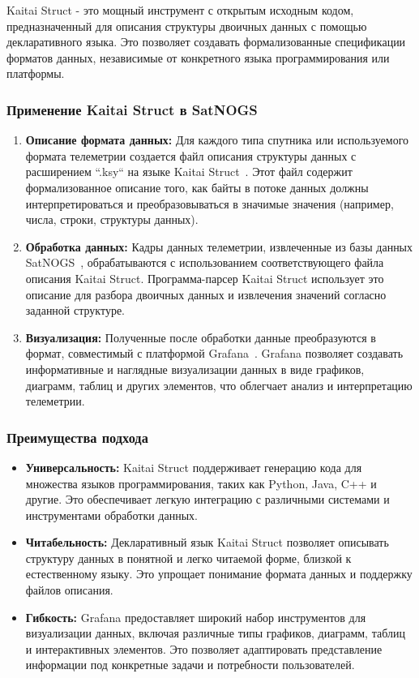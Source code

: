 \documentclass[14pt, a4paper]{../cls/coursework}
\begin{document}
    Kaitai Struct - это мощный инструмент с открытым исходным кодом, предназначенный для описания структуры двоичных данных с помощью декларативного языка.
    Это позволяет создавать формализованные спецификации форматов данных,  независимые от конкретного языка программирования или платформы.

    \subsubsection{Применение Kaitai Struct в SatNOGS}

    \begin{enumerate}
        \item \textbf{Описание формата данных:} Для каждого типа спутника или используемого формата телеметрии создается файл описания структуры данных с расширением ``.ksy`` на языке Kaitai Struct~\cite{katai_docs}.
        Этот файл содержит формализованное описание того, как байты в потоке данных должны интерпретироваться и преобразовываться в значимые значения (например, числа, строки, структуры данных).
        \item \textbf{Обработка данных:} Кадры данных телеметрии, извлеченные из базы данных SatNOGS~\cite{satnogs_database_docs}, обрабатываются с использованием соответствующего файла описания Kaitai Struct.
        Программа-парсер Kaitai Struct использует это описание для разбора двоичных данных и извлечения значений согласно заданной структуре.
        \item \textbf{Визуализация:} Полученные после обработки данные преобразуются в формат, совместимый с платформой Grafana~\cite{grafana_docs}.
        Grafana позволяет создавать информативные и наглядные визуализации данных в виде графиков, диаграмм, таблиц и других элементов,  что облегчает анализ и интерпретацию телеметрии.
    \end{enumerate}

    \subsubsection{Преимущества подхода}

    \begin{itemize}[label={--}]
        \item \textbf{Универсальность:} Kaitai Struct поддерживает генерацию кода для множества языков программирования, таких как Python, Java, C++ и другие.
        Это обеспечивает легкую интеграцию с различными системами и инструментами обработки данных.
        \item \textbf{Читабельность:}  Декларативный язык Kaitai Struct позволяет описывать структуру данных в понятной и легко читаемой форме,  близкой к естественному языку.
        Это упрощает понимание формата данных и поддержку файлов описания.
        \item \textbf{Гибкость:} Grafana предоставляет широкий набор инструментов для визуализации данных, включая различные типы графиков, диаграмм, таблиц и интерактивных элементов.
        Это позволяет адаптировать представление информации под конкретные задачи и потребности пользователей.
    \end{itemize}
\end{document}
